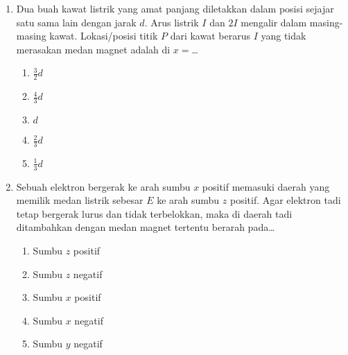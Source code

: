 \documentclass[A4,12PT, english, twocolumn]{journal}
\begin{document}
\begin{enumerate}
\item Dua buah kawat listrik yang amat panjang diletakkan dalam posisi sejajar satu sama lain dengan jarak $d$. Arus listrik $I$ dan $2I$ mengalir dalam masing-masing kawat. Lokasi/posisi titik $P$ dari kawat berarus $I$ yang tidak merasakan medan magnet adalah di $x=$\dots
\begin{center}
\end{center}
   \begin{enumerate}
        \item $\frac{3}{2}d$
        \item $\frac{4}{3}d$
        \item $d$
        \item $\frac{2}{3}d$
        \item $\frac{1}{3}d$
   \end{enumerate}
   
\item Sebuah elektron bergerak ke arah sumbu $x$ positif memasuki daerah yang memilik medan listrik sebesar $E$ ke arah sumbu $z$ positif. Agar elektron tadi tetap bergerak lurus dan tidak terbelokkan, maka di daerah tadi ditambahkan dengan medan magnet tertentu berarah pada\dots
    \begin{enumerate}
        \item Sumbu $z$ positif
        \item Sumbu $z$ negatif
        \item Sumbu $x$ positif
        \item Sumbu $x$ negatif
        \item Sumbu $y$ negatif
    \end{enumerate}
  

\end{enumerate}
\end{document}
